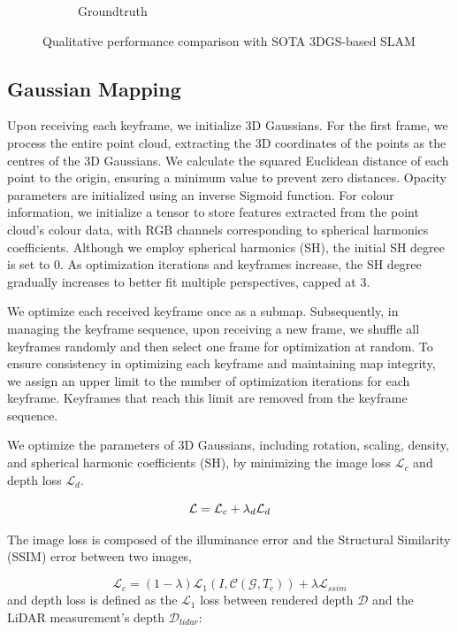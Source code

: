 \documentclass[lettersize,journal]{IEEEtran}
\begin{document}
\begin{figure}[ht]
\begin{subfigure}{0.24\textwidth}
        \caption{Groundtruth}
        \label{fig:qualitativecomparisongroundtruth}
    \end{subfigure}
    \caption{Qualitative performance comparison with SOTA 3DGS-based SLAM}
    \label{fig:qualitativecomparison}
    \vspace{-1.5em}%
\end{figure}


\subsection{Gaussian Mapping}
Upon receiving each keyframe, we initialize 3D Gaussians. For the first frame, we process the entire point cloud, extracting the 3D coordinates of the points as the centres of the 3D Gaussians. We calculate the squared Euclidean distance of each point to the origin, ensuring a minimum value to prevent zero distances. Opacity parameters are initialized using an inverse Sigmoid function. For colour information, we initialize a tensor to store features extracted from the point cloud's colour data, with RGB channels corresponding to spherical harmonics coefficients. Although we employ spherical harmonics (SH), the initial SH degree is set to 0. As optimization iterations and keyframes increase, the SH degree gradually increases to better fit multiple perspectives, capped at 3.

We optimize each received keyframe once as a submap. Subsequently, in managing the keyframe sequence, upon receiving a new frame, we shuffle all keyframes randomly and then select one frame for optimization at random. To ensure consistency in optimizing each keyframe and maintaining map integrity, we assign an upper limit to the number of optimization iterations for each keyframe. Keyframes that reach this limit are removed from the keyframe sequence.

We optimize the parameters of 3D Gaussians, including rotation, scaling, density, and spherical harmonic coefficients (SH), by minimizing the image loss $\mathcal{L}_c$ and depth loss $\mathcal{L}_d$.

\begin{equation}
\mathcal{L}={\mathcal{L}_c} + {{\lambda}_d}{\mathcal{L}_d}
\label{eq:mathcal{L}}
\end{equation}

The image loss is composed of the illuminance error and the Structural Similarity (SSIM) error between two images,

\begin{equation}
\mathcal{L}_c=(1-\lambda){\mathcal{L}_1}(I,\mathcal{C}(\mathcal{G},{T_c})) + \lambda{\mathcal{L}_{ssim}}
\label{eq:mathcalLc}
\end{equation}
and depth loss is defined as the $\mathcal{L}_1$ loss between rendered depth $\mathcal{D}$ and the LiDAR measurement’s depth $\mathcal{D}_{lidar}$:
\end{document}
